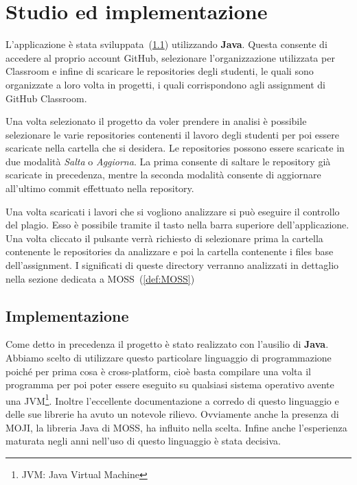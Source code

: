 \chapter{Studio ed implementazione}\label{def:StudioImplementazione}
	L'applicazione è stata sviluppata~(\ref{def:Implementazione}) utilizzando \textbf{Java}. Questa consente di accedere al proprio account GitHub, selezionare l'organizzazione utilizzata per Classroom e infine di scaricare le repositories degli studenti, le quali sono organizzate a loro volta in progetti, i quali corrispondono agli assignment di GitHub Classroom.
	
	Una volta selezionato il progetto da voler prendere in analisi è possibile selezionare le varie repositories contenenti il lavoro degli studenti per poi essere scaricate nella cartella che si desidera.
	Le repositories possono essere scaricate in due modalità \textit{Salta} o \textit{Aggiorna}. La prima consente di saltare le repository già scaricate in precedenza, mentre la seconda modalità consente di aggiornare all'ultimo commit effettuato nella repository.
	
	Una volta scaricati i lavori che si vogliono analizzare si può eseguire il controllo del plagio. Esso è possibile tramite il tasto nella barra superiore dell'applicazione. Una volta cliccato il pulsante verrà richiesto di selezionare prima la cartella contenente le repositories da analizzare e poi la cartella contenente i files base dell'assignment.
	I significati di queste directory verranno analizzati in dettaglio nella sezione dedicata a MOSS~(\ref{def:MOSS})
	
	\section{Implementazione}\label{def:Implementazione}
		Come detto in precedenza il progetto è stato realizzato con l'ausilio di \textbf{Java}.
		Abbiamo scelto di utilizzare questo particolare linguaggio di programmazione poiché per prima cosa è cross-platform, cioè basta compilare una volta il programma per poi poter essere eseguito su qualsiasi sistema operativo avente una JVM\footnote{JVM: Java Virtual Machine}.
		Inoltre l'eccellente documentazione a corredo di questo linguaggio e delle sue librerie ha avuto un notevole rilievo.
		Ovviamente anche la presenza di MOJI, la libreria Java di MOSS, ha influito nella scelta.
		Infine anche l'esperienza maturata negli anni nell'uso di questo linguaggio è stata decisiva.
		

